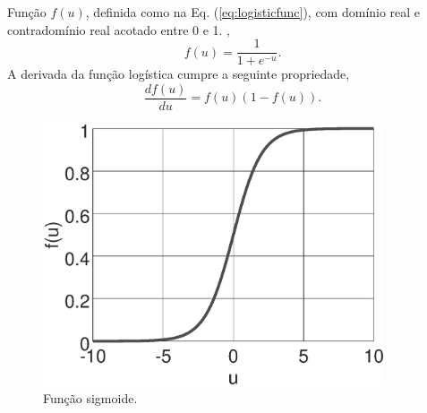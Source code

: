 

\begin{minipage}{0.55\textwidth}
\begin{definition}\label{def:logisticfunc}
Função $f(u)$, definida como na Eq. (\ref{eq:logisticfunc}), 
com domínio real e 
contradomínio real acotado entre 0 e 1. \cite[pp. 27]{kurkova2001artificial},
\begin{equation}\label{eq:logisticfunc}
f(u)=\frac{1}{1+e^{-u}}.
\end{equation}
A derivada da função logística cumpre a seguinte propriedade, 
\begin{equation}\label{eq:derlogisticfunc}
\frac{df(u)}{du}=f(u)(1-f(u)).
\end{equation}
\end{definition}
\end{minipage}
\begin{minipage}{0.45\textwidth}
     \begin{figure}[H]
         \centering
         \includegraphics[width=0.9\textwidth]{chapters/classificacao/mfiles/logisticfunc/sigmoid.eps}
         \caption{Função sigmoide. }
         \label{fig:logisticfunc}
     \end{figure}
\end{minipage}
